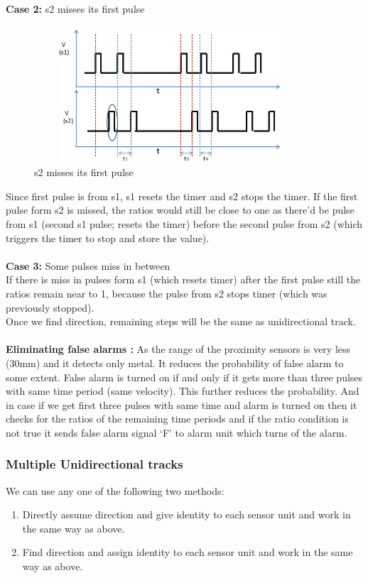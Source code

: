 \documentclass[aps,letterpaper,11pt]{article}
\begin{document}
\textbf{Case 2:} s2 misses its first pulse \\
\begin{figure}[H]
\begin{center}
\includegraphics[height = 2in,width=4in,angle=00]{figures/w8_2_pulse_missing.JPG}
\caption{\small s2 misses its first pulse}
\end{center}
\end{figure}
Since first pulse is from s1, s1 resets the timer and s2 stops the timer. If the first pulse form s2 is
missed, the ratios would still be close to one as there'd be pulse from s1 (second s1 pulse; resets
the timer) before the second pulse from s2 (which triggers the timer to stop and store the value). \\ \\

\textbf{Case 3:} Some pulses miss in between \\
If there is miss in pulses form s1 (which resets timer) after the first pulse still the ratios remain
near to 1, because the pulse from s2 stops timer (which was previously stopped). \\

Once we find direction, remaining steps will be the same as unidirectional track. \\ \\
\textbf{Eliminating false alarms :}
As the range of the proximity sensors is very less (30mm) and it detects only metal. It reduces the probability of false alarm to some extent. False alarm is turned on if and only if it gets more than three pulses with same time period (same velocity). This further reduces the probability. And in case
if we get first three pulses with same time and alarm is turned on then it checks for the ratios of the remaining time periods and if the ratio condition is not true it sends false alarm signal `F' to alarm unit which turns of the alarm. \\

\subsubsection{Multiple Unidirectional tracks}
We can use any one of the following two methods:
\begin{enumerate}
\item Directly assume direction and give identity to each sensor unit and work in the same way as above.
\item Find direction and assign identity to each sensor unit and work in the same way as above.
\end{enumerate}
\end{document}
